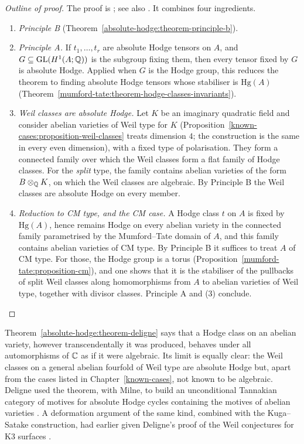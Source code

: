 \begin{proof}[Outline of proof]
The proof is \cite{deligne-abelian}; see also \cite{charles-schnell}. It combines four ingredients.
\begin{enumerate}
\item \emph{Principle B} (Theorem~\ref{absolute-hodge:theorem-principle-b}).
\item \emph{Principle A.} If $t_1, \ldots, t_r$ are absolute Hodge tensors on $A$, and $G \subseteq \mathrm{GL}(H^1(A; \mathbb{Q}))$ is the subgroup fixing them, then every tensor fixed by $G$ is absolute Hodge. Applied
when $G$ is the Hodge group, this reduces the theorem to finding absolute Hodge tensors whose stabiliser is $\mathrm{Hg}(A)$ (Theorem~\ref{mumford-tate:theorem-hodge-classes-invariants}).
\item \emph{Weil classes are absolute Hodge.} Let $K$ be an imaginary quadratic field and consider abelian varieties of Weil type for $K$ (Proposition~\ref{known-cases:proposition-weil-classes} treats
dimension $4$; the construction is the same in every even dimension), with a fixed type of polarisation. They form a connected family over which the Weil classes form a flat family of Hodge classes. For
the \emph{split} type, the family contains abelian varieties of the form $B \otimes_{\mathbb{Q}} K$, on which the Weil classes are algebraic. By Principle B the Weil classes are absolute Hodge on every member.
\item \emph{Reduction to CM type, and the CM case.} A Hodge class $t$ on $A$ is fixed by $\mathrm{Hg}(A)$, hence remains Hodge on every abelian variety in the connected family parametrised by the
Mumford--Tate domain of $A$, and this family contains abelian varieties of CM type. By Principle B it suffices to treat $A$ of CM type. For those, the Hodge group is a torus
(Proposition~\ref{mumford-tate:proposition-cm}), and one shows that it is the stabiliser of the pullbacks of split Weil classes along homomorphisms from $A$ to abelian varieties of Weil type, together with
divisor classes. Principle A and (3) conclude.
\end{enumerate}
\end{proof}

\begin{remark}\label{absolute-hodge:remark-force-and-limits}
Theorem~\ref{absolute-hodge:theorem-deligne} says that a Hodge class on an abelian variety, however transcendentally it was produced, behaves under all automorphisms of $\mathbb{C}$ as if it were algebraic. Its
limit is equally clear: the Weil classes on a general abelian fourfold of Weil type are absolute Hodge but, apart from the cases listed in Chapter~\ref{known-cases}, not known to be algebraic. Deligne used
the theorem, with Milne, to build an unconditional Tannakian category of motives for absolute Hodge cycles containing the motives of abelian varieties \cite{deligne-milne}. A deformation argument of the
same kind, combined with the Kuga--Satake construction, had earlier given Deligne's proof of the Weil conjectures for K3 surfaces \cite{deligne-k3}.
\end{remark}

